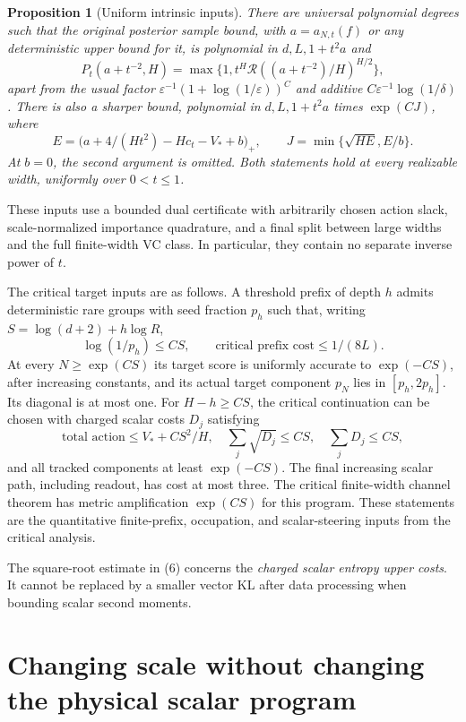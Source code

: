 \documentclass[11pt]{article}
\newtheorem{proposition}[theorem]{Proposition}
\theoremstyle{remark}\newtheorem{remark}[theorem]{Remark}
\begin{document}
\begin{proposition}[Uniform intrinsic inputs]
\label{prop:intrinsic}
There are universal polynomial degrees such that the original
posterior sample bound, with $a=a_{N,t}(f)$ or any deterministic
upper bound for it, is polynomial in $d,L,1+t^2a$ and
\[
 P_t(a+t^{-2},H)
 =\max\{1,t^H\mathcal R((a+t^{-2})/H)^{H/2}\},      \tag{3}
\]
apart from the usual factor
$\varepsilon^{-1}(1+\log(1/\varepsilon))^C$ and additive
$C\varepsilon^{-1}\log(1/\delta)$.
There is also a sharper bound, polynomial in $d,L,1+t^2a$ times
$\exp(CJ)$, where
\[
 E=\bigl(a+4/(Ht^2)-Hc_t-V_*+b\bigr)_+,
 \qquad
 J=\min\{\sqrt{HE},E/b\}.                         \tag{4}
\]
At $b=0$, the second argument is omitted. Both statements hold at
every realizable width, uniformly over $0<t\le1$.
\end{proposition}

These inputs use a bounded dual certificate with arbitrarily chosen
action slack, scale-normalized importance quadrature, and a final
split between large widths and the full finite-width VC class. In
particular, they contain no separate inverse power of $t$.

The critical target inputs are as follows. A threshold prefix of
depth $h$ admits deterministic rare groups with seed fraction $p_h$
such that, writing $S=\log(d+2)+h\log R$,
\[
 \log(1/p_h)\le CS,\qquad
 \text{critical prefix cost}\le1/(8L).
                                                               \tag{5}
\]
At every $N\ge\exp(CS)$ its target score is uniformly accurate to
$\exp(-CS)$, after increasing constants, and its actual target
component $p_N$ lies in $[p_h,2p_h]$. Its diagonal is at most one.
For $H-h\ge CS$, the critical continuation can be chosen with charged
scalar costs $D_j$ satisfying
\[
 \text{total action}\le V_*+CS^2/H,\quad
 \sum_j\sqrt{D_j}\le CS,\quad
 \sum_jD_j\le CS,                                \tag{6}
\]
and all tracked components at least $\exp(-CS)$. The final increasing
scalar path, including readout, has cost at most three. The critical
finite-width channel theorem has metric amplification $\exp(CS)$
for this program. These statements are the quantitative finite-prefix,
occupation, and scalar-steering inputs from the critical analysis.

The square-root estimate in (6) concerns the \emph{charged scalar
entropy upper costs}. It cannot be replaced by a smaller vector KL
after data processing when bounding scalar second moments.

\section{Changing scale without changing the physical scalar program}
\end{document}
